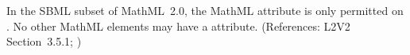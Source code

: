 In the SBML subset of MathML~2.0, the MathML attribute
 is only permitted on .  No other
MathML elements may have a  attribute.  (References:
L2V2 Section~3.5.1; )
